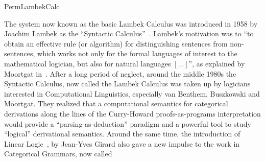 \begin{entry}{PermLambekCalc}
\begin{history}
The system now known as the basic Lambek Calculus was introduced in
1958 by Joachim Lambek as the ``Syntactic Calculus''~\cite{lambek1958}.
Lambek's motivation was to ``to obtain an effective rule (or
algorithm) for distinguishing sentences from non-sentences, which
works not only for the formal languages of interest to the
mathematical logician, but also for natural languages $[\ldots]$'', as
explained by Moortgat in~\cite{moortgat2010}.  After a long period of
neglect, around the middle 1980s the Syntactic Calculus, now called
the Lambek Calculus was taken up by logicians interested in
Computational Linguistics, especially van Benthem, Buszkowski and
Moortgat. They realized that a computational semantics for categorical
derivations along the lines of the Curry-Howard proofs-as-programs
interpretation would provide  a ``parsing-as-deduction''
paradigm and a powerful tool to study ``logical'' derivational
semantics. Around the same time, the introduction of Linear Logic~, by
Jean-Yves Girard also gave a new impulse to the work in
Categorical Grammars, now called 
\end{history}


\end{entry}

